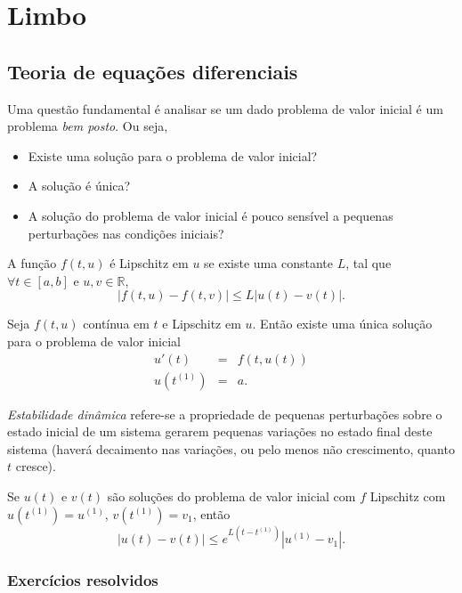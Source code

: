 %


\chapter{Limbo}
\section{Teoria de equações diferenciais}
Uma questão fundamental é analisar se um dado problema de valor inicial é um problema \emph{bem posto}. Ou seja,
\begin{itemize}
 \item Existe uma solução para o problema de valor inicial?
 \item A solução é única?
 \item A solução do problema de valor inicial é pouco sensível a pequenas perturbações nas condições iniciais?
\end{itemize}


\begin{defn}
A função $f(t, u)$ é Lipschitz em $u$ se existe uma constante $L$, tal que $\forall t \in [a, b]$ e $u, v \in \mathbb R$,
$$ |f(t, u)-f(t, v)| \leq L|u(t)-v(t)|. $$
\end{defn}


\begin{teo}
Seja $f(t, u)$ contínua em $t$ e Lipschitz em $u$. Então existe uma única solução para o problema de valor inicial
\begin{eqnarray}
  u'(t)  &=& f(t, u(t)) \\
  u(t^{(1)}) &=& a.
\end{eqnarray}
\end{teo}

\begin{defn}
  \emph{Estabilidade dinâmica} refere-se a propriedade de pequenas perturbações sobre o estado inicial de um sistema gerarem pequenas variações no estado final deste sistema (haverá decaimento nas variações, ou pelo menos não crescimento, quanto $t$ cresce).
\end{defn}

\begin{teo}
Se $u(t)$ e $v(t)$ são soluções do problema de valor inicial com $f$ Lipschitz com $u(t^{(1)})=u^{(1)}$, $v(t^{(1)})=v_1$, então
$$ |u(t)-v(t)| \leq  e^{L(t-t^{(1)})}|u^{(1)}-v_1| . $$
\end{teo}

\subsection*{Exercícios resolvidos}

